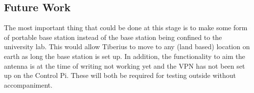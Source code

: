 \subsection{Future Work}
The most important thing that could be done at this stage is to make some form of portable base station instead of the base station being confined to the university lab. This would allow Tiberius to move to any (land based) location on earth as long the base station is set up.
\newline
In addition, the functionality to aim the antenna is at the time of writing not working yet and the VPN has not been set up on the Control Pi. These will both be required for testing outside without accompaniment.
